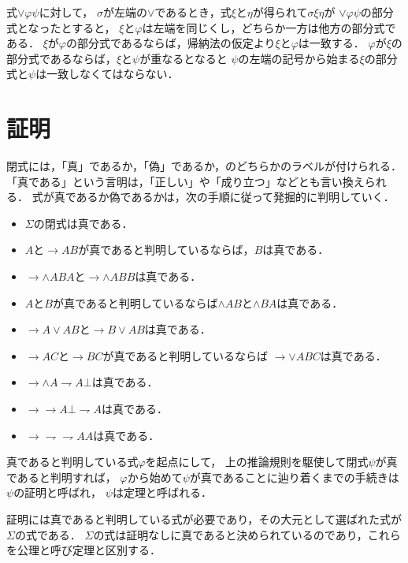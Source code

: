 \documentclass[a4j,10.5pt,oneside,openany]{jsbook}
\begin{document}
	式$\vee \varphi \psi$に対して，
	$\sigma$が左端の$\vee$であるとき，式$\xi$と$\eta$が得られて$\sigma \xi \eta$が
	$\vee \varphi \psi$の部分式となったとすると，
	$\xi$と$\varphi$は左端を同じくし，どちらか一方は他方の部分式である．
	$\xi$が$\varphi$の部分式であるならば，帰納法の仮定より$\xi$と$\varphi$は一致する．
	$\varphi$が$\xi$の部分式であるならば，$\xi$と$\psi$が重なるとなると
	$\psi$の左端の記号から始まる$\xi$の部分式と$\psi$は一致しなくてはならない．
	
\section{証明}
	閉式には，「真」であるか，「偽」であるか，のどちらかのラベルが付けられる．
	「真である」という言明は，「正しい」や「成り立つ」などとも言い換えられる．
	式が真であるか偽であるかは，次の手順に従って発掘的に判明していく．
	
	\begin{itemize}
		\item $\Sigma$の閉式は真である．
		\item $A$と$\rightarrow AB$が真であると判明しているならば，$B$は真である．
		\item $\rightarrow \wedge ABA$と$\rightarrow \wedge ABB$は真である．
		\item $A$と$B$が真であると判明しているならば$\wedge AB$と$\wedge BA$は真である．
		\item $\rightarrow A\vee AB$と$\rightarrow B \vee AB$は真である．
		\item $\rightarrow AC$と$\rightarrow BC$が真であると判明しているならば
			$\rightarrow \vee ABC$は真である．
		\item $\rightarrow\wedge A \rightharpoondown A \bot$は真である．
		\item $\rightarrow \rightarrow A \bot \rightharpoondown A$は真である．
		\item $\rightarrow \rightharpoondown\rightharpoondown AA$は真である．
	\end{itemize}
	
	真であると判明している式$\varphi$を起点にして，
	上の推論規則を駆使して閉式$\psi$が真であると判明すれば，
	$\varphi$から始めて$\psi$が真であることに辿り着くまでの手続きは$\psi$の証明と呼ばれ，
	$\psi$は定理と呼ばれる．
	
	証明には真であると判明している式が必要であり，その大元として選ばれた式が$\Sigma$の式である．
	$\Sigma$の式は証明なしに真であると決められているのであり，これらを公理と呼び定理と区別する．
	
\end{document}
